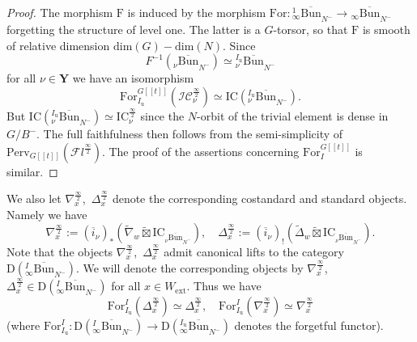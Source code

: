 \documentclass[11pt]{amsart}
\theoremstyle{plain}
\theoremstyle{remark}
\numberwithin{equation}{section}
\begin{document}
\begin{proof}
    The morphism $\mathrm{F}$ is induced by the morphism $\mathrm{For}:{^1_\infty\overline{\mathrm{Bun}}}_{N^-}\to {_\infty\overline{\mathrm{Bun}}}_{N^-}$ forgetting the structure of level one. The latter is a $G$-torsor, so that $\mathrm{F}$ is smooth of relative dimension $\mathrm{dim}(G)-\mathrm{dim}(N)$. Since
    $$F^{-1}({_\nu\overline{\mathrm{Bun}}}_{N^-})\simeq {^{I_\mathrm{u}}_\nu\overline{\mathrm{Bun}}}_{N^-}$$
    for all $\nu\in\mathbf{Y}$ we have an isomorphism
    $$\mathrm{For}^{G[[t]]}_{I_\mathrm{u}}(\mathcal{IC}_\nu^\frac{\infty}{2})\simeq \mathrm{IC}({^{I_\mathrm{u}}_\nu\overline{\mathrm{Bun}}}_{N^-}).$$
    But $\mathrm{IC}({^{I_\mathrm{u}}_\nu\overline{\mathrm{Bun}}}_{N^-})\simeq\mathrm{IC}_\nu^\frac{\infty}{2}$ since the $N$-orbit of the trivial element is dense in $G/B^-$. The full faithfulness then follows from the semi-simplicity of $\mathrm{Perv}_{G[[t]]}(\mathcal{F}l^{\frac{\infty}{2}})$. The proof of the assertions concerning $\mathrm{For}^{G[[t]]}_{I}$ is similar.
\end{proof}
	We also let $\nabla_x^{\frac{\infty}{2}}$,~$\Delta_x^{\frac{\infty}{2}}$ denote the corresponding costandard and standard objects. Namely we have
	$$\nabla_x^{\frac{\infty}{2}}:= (\overline{i}_\nu)_{*}\left(\tilde{\nabla}_w\widetilde{\boxtimes}\mathrm{IC}_{{_\nu\overline{\mathrm{Bun}}}_{N^-}}\right),\quad  \Delta_x^{\frac{\infty}{2}}:= (\overline{i}_\nu)_{!}\left(\tilde{\Delta}_w\widetilde{\boxtimes}\mathrm{IC}_{{_\nu\overline{\mathrm{Bun}}}_{N^-}}\right).$$
Note that the objects $\nabla_x^{\frac{\infty}{2}}$,~$\Delta_x^{\frac{\infty}{2}}$ admit canonical lifts to the category $\mathrm{D}({^{I}_\infty\overline{\mathrm{Bun}}}_{N^-})$. We will denote the corresponding objects by $\nabla_x^{\frac{\infty}{2}}$,~$\Delta_x^{\frac{\infty}{2}}\in \mathrm{D}({^{I}_\infty\overline{\mathrm{Bun}}}_{N^-})$ for all $x\in W_\mathrm{ext}$. Thus we have 
$$\mathrm{For}^I_{I_\mathrm{u}}(\Delta_x^{\frac{\infty}{2}})\simeq \Delta_x^{\frac{\infty}{2}},\quad \mathrm{For}^I_{I_\mathrm{u}}(\nabla_x^{\frac{\infty}{2}})\simeq \nabla_x^{\frac{\infty}{2}} $$
(where $\mathrm{For}^I_{I_\mathrm{u}}:\mathrm{D}({^{I}_\infty\overline{\mathrm{Bun}}}_{N^-})\to \mathrm{D}({^{I_\mathrm{u}}_\infty\overline{\mathrm{Bun}}}_{N^-})$ denotes the forgetful functor).
 
\end{document}
